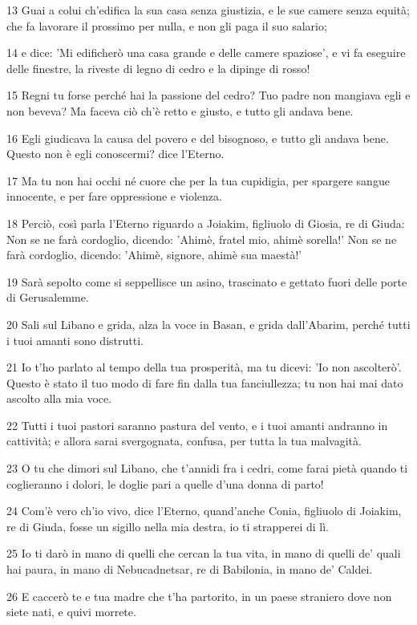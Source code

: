 \par 13 Guai a colui ch'edifica la sua casa senza giustizia, e le sue camere senza equità; che fa lavorare il prossimo per nulla, e non gli paga il suo salario;
\par 14 e dice: 'Mi edificherò una casa grande e delle camere spaziose', e vi fa eseguire delle finestre, la riveste di legno di cedro e la dipinge di rosso!
\par 15 Regni tu forse perché hai la passione del cedro? Tuo padre non mangiava egli e non beveva? Ma faceva ciò ch'è retto e giusto, e tutto gli andava bene.
\par 16 Egli giudicava la causa del povero e del bisognoso, e tutto gli andava bene. Questo non è egli conoscermi? dice l'Eterno.
\par 17 Ma tu non hai occhi né cuore che per la tua cupidigia, per spargere sangue innocente, e per fare oppressione e violenza.
\par 18 Perciò, così parla l'Eterno riguardo a Joiakim, figliuolo di Giosia, re di Giuda: Non se ne farà cordoglio, dicendo: 'Ahimè, fratel mio, ahimè sorella!' Non se ne farà cordoglio, dicendo: 'Ahimè, signore, ahimè sua maestà!'
\par 19 Sarà sepolto come si seppellisce un asino, trascinato e gettato fuori delle porte di Gerusalemme.
\par 20 Sali sul Libano e grida, alza la voce in Basan, e grida dall'Abarim, perché tutti i tuoi amanti sono distrutti.
\par 21 Io t'ho parlato al tempo della tua prosperità, ma tu dicevi: 'Io non ascolterò'. Questo è stato il tuo modo di fare fin dalla tua fanciullezza; tu non hai mai dato ascolto alla mia voce.
\par 22 Tutti i tuoi pastori saranno pastura del vento, e i tuoi amanti andranno in cattività; e allora sarai svergognata, confusa, per tutta la tua malvagità.
\par 23 O tu che dimori sul Libano, che t'annidi fra i cedri, come farai pietà quando ti coglieranno i dolori, le doglie pari a quelle d'una donna di parto!
\par 24 Com'è vero ch'io vivo, dice l'Eterno, quand'anche Conia, figliuolo di Joiakim, re di Giuda, fosse un sigillo nella mia destra, io ti strapperei di lì.
\par 25 Io ti darò in mano di quelli che cercan la tua vita, in mano di quelli de' quali hai paura, in mano di Nebucadnetsar, re di Babilonia, in mano de' Caldei.
\par 26 E caccerò te e tua madre che t'ha partorito, in un paese straniero dove non siete nati, e quivi morrete.
